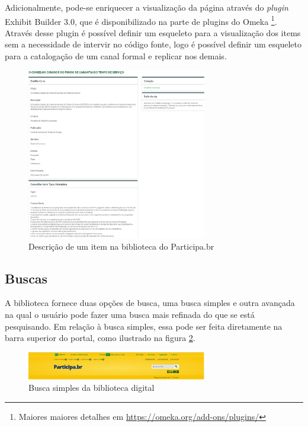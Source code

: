 Adicionalmente, pode-se enriquecer a visualização da página através do \textit{plugin} Exhibit Builder 3.0, que é disponibilizado na parte de plugins do Omeka \footnote{Maiores maiores detalhes em \url{https://omeka.org/add-ons/plugins/}}. Através desse plugin é possível definir um esqueleto para a visualização dos items sem a necessidade de intervir no código fonte, logo é possível definir um esqueleto para a catalogação de um canal formal e replicar nos demais.

\graphicspath{{figuras/prototipo/}}
\begin{figure}[H]
\centering
\includegraphics[width=0.7\textwidth]{descricao-item}
\caption{Descrição de um item na biblioteca do Participa.br}
\label{fig:descricao_item_prototipo}
\end{figure}

\subsection*{Buscas}

A biblioteca fornece duas opções de busca, uma busca simples e outra avançada na qual o usuário pode fazer uma busca mais refinada do que se está pesquisando.
Em relação à busca simples, essa pode ser feita diretamente na barra superior do portal, como ilustrado na figura \ref{fig:buscasimples_prototipo}.

\graphicspath{{figuras/prototipo/}}
\begin{figure}[H]
\centering
\includegraphics[width=0.7\textwidth]{cabecalho}
\caption{Busca simples da biblioteca digital}
\label{fig:buscasimples_prototipo}
\end{figure}

